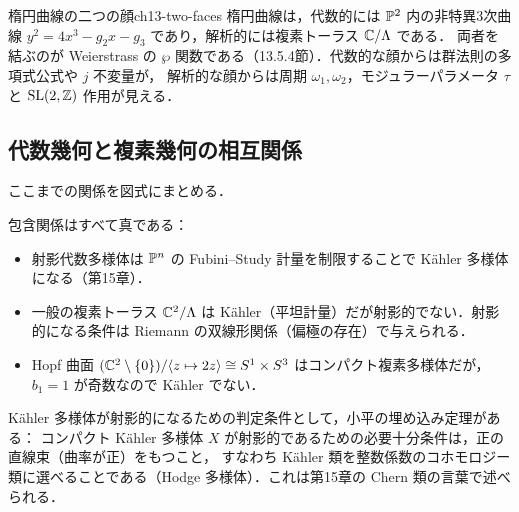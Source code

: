 \begin{myex}{楕円曲線の二つの顔}{ch13-two-faces}
楕円曲線は，代数的には $\mathbb{P}^2$ 内の非特異3次曲線 $y^2=4x^3-g_2x-g_3$ であり，解析的には複素トーラス $\mathbb{C}/\Lambda$ である．
両者を結ぶのが Weierstrass の $\wp$ 関数である（13.5.4節）．代数的な顔からは群法則の多項式公式や $j$ 不変量が，
解析的な顔からは周期 $\omega_1,\omega_2$，モジュラーパラメータ $\tau$ と $\operatorname{SL}(2,\mathbb{Z})$ 作用が見える．
\end{myex}

\subsection{代数幾何と複素幾何の相互関係}

ここまでの関係を図式にまとめる．
\begin{center}
\end{center}
包含関係はすべて真である：
\begin{itemize}
  \item 射影代数多様体は $\mathbb{P}^n$ の Fubini--Study 計量を制限することで Kähler 多様体になる（第15章）．
  \item 一般の複素トーラス $\mathbb{C}^2/\Lambda$ は Kähler（平坦計量）だが射影的でない．射影的になる条件は Riemann の双線形関係（偏極の存在）で与えられる．
  \item Hopf 曲面 $(\mathbb{C}^2\setminus\{0\})/\langle z\mapsto 2z\rangle\cong S^1\times S^3$ はコンパクト複素多様体だが，$b_1=1$ が奇数なので Kähler でない．
\end{itemize}
Kähler 多様体が射影的になるための判定条件として，小平の埋め込み定理がある：
コンパクト Kähler 多様体 $X$ が射影的であるための必要十分条件は，正の直線束（曲率が正）をもつこと，
すなわち Kähler 類を整数係数のコホモロジー類に選べることである（Hodge 多様体）．これは第15章の Chern 類の言葉で述べられる．

